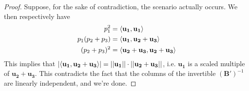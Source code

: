 \begin{proof}
\begin{table}[H]
\end{table}
Suppose, for the sake of contradiction, the scenario actually occurs. We then respectively have
\begin{align*}
p_1^2 &= \langle\mathbf{u_1}, \mathbf{u_1}\rangle \\
p_1(p_2 + p_3) &= \langle\mathbf{u_1}, \mathbf{u_2} + \mathbf{u_3}\rangle \\
(p_2 + p_3)^2 &= \langle\mathbf{u_2} + \mathbf{u_3}, \mathbf{u_2} + \mathbf{u_3}\rangle
\end{align*}
This implies that $|\langle\mathbf{u_1}, \mathbf{u_2} + \mathbf{u_3}\rangle| = ||\mathbf{u_1}||\cdot||\mathbf{u_2} + \mathbf{u_3}||$, i.e. $\mathbf{u_1}$ is a scaled multiple of $\mathbf{u_2} + \mathbf{u_3}$. This contradicts the fact that the columns of the invertible $(\mathbf{B'})^{-1}$ are linearly independent, and we're done.
\end{proof}


